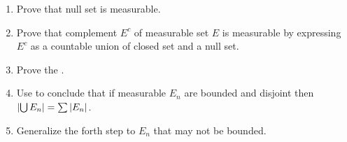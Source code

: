 \documentclass{report}
\begin{document}
\begin{mdframed}
\begin{enumerate}[label=(\roman*)]
\item Prove that null set is measurable.  
  \item Prove that complement $E^c$ of measurable set $E$ is measurable by expressing $E^c$ as a countable union of closed set and a null set.
  \item Prove the .  
  \item Use  to conclude that if measurable $E_n$ are bounded and disjoint then $\left|\bigcup E_n\right|= \sum \left|E_n\right|$. 
  \item Generalize the forth step to $E_n$ that may not be bounded. 
\end{enumerate}
\end{mdframed}
\end{document}
